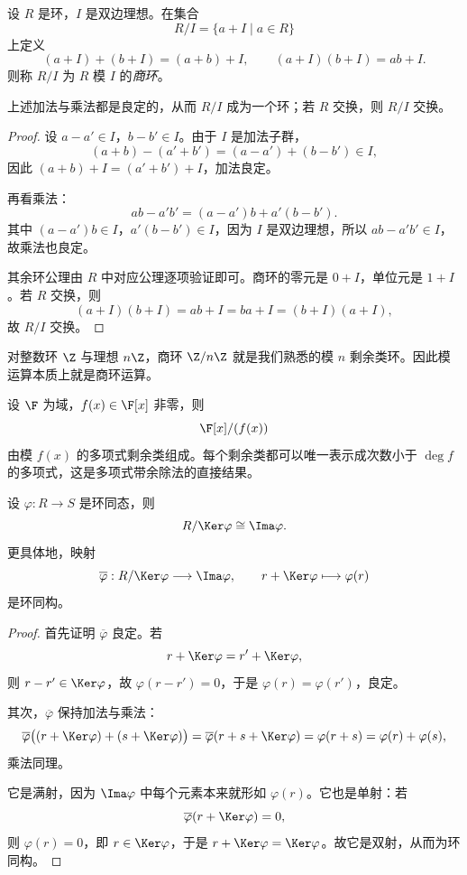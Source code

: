 \begin{definition}
设 $R$ 是环，$I$ 是双边理想。在集合
\[
R/I=\{a+I\mid a\in R\}
\]
上定义
\[
(a+I)+(b+I)=(a+b)+I,
\qquad
(a+I)(b+I)=ab+I.
\]
则称 $R/I$ 为 $R$ 模 $I$ 的\emph{商环}。
\end{definition}

\begin{proposition}
上述加法与乘法都是良定的，从而 $R/I$ 成为一个环；若 $R$ 交换，则 $R/I$ 交换。
\end{proposition}

\begin{proof}
设 $a-a'\in I$，$b-b'\in I$。由于 $I$ 是加法子群，
\[
(a+b)-(a'+b')=(a-a')+(b-b')\in I,
\]
因此 $(a+b)+I=(a'+b')+I$，加法良定。

再看乘法：
\[
ab-a'b'=(a-a')b+a'(b-b').
\]
其中 $(a-a')b\in I$，$a'(b-b')\in I$，因为 $I$ 是双边理想，所以 $ab-a'b'\in I$，故乘法也良定。

其余环公理由 $R$ 中对应公理逐项验证即可。商环的零元是 $0+I$，单位元是 $1+I$。若 $R$ 交换，则
\[
(a+I)(b+I)=ab+I=ba+I=(b+I)(a+I),
\]
故 $R/I$ 交换。
\end{proof}

\begin{example}
对整数环 $\Z$ 与理想 $n\Z$，商环 $\Z/n\Z$ 就是我们熟悉的模 $n$ 剩余类环。因此模运算本质上就是商环运算。
\end{example}

\begin{example}
设 $\F$ 为域，$f(x)\in\F[x]$ 非零，则
\[
\F[x]/(f(x))
\]
由模 $f(x)$ 的多项式剩余类组成。每个剩余类都可以唯一表示成次数小于 $\deg f$ 的多项式，这是多项式带余除法的直接结果。
\end{example}

\begin{theorem}[第一同构定理]
设 $\varphi:R\to S$ 是环同态，则
\[
R/\Ker\varphi\cong \Ima\varphi.
\]
更具体地，映射
\[
\overline{\varphi}:R/\Ker\varphi\longrightarrow \Ima\varphi,
\qquad
r+\Ker\varphi\longmapsto \varphi(r)
\]
是环同构。
\end{theorem}

\begin{proof}
首先证明 $\overline{\varphi}$ 良定。若
\[
r+\Ker\varphi=r'+\Ker\varphi,
\]
则 $r-r'\in\Ker\varphi$，故 $\varphi(r-r')=0$，于是 $\varphi(r)=\varphi(r')$，良定。

其次，$\overline{\varphi}$ 保持加法与乘法：
\[
\overline{\varphi}\bigl((r+\Ker\varphi)+(s+\Ker\varphi)\bigr)
=\overline{\varphi}(r+s+\Ker\varphi)=\varphi(r+s)=\varphi(r)+\varphi(s),
\]
乘法同理。

它是满射，因为 $\Ima\varphi$ 中每个元素本来就形如 $\varphi(r)$。它也是单射：若
\[
\overline{\varphi}(r+\Ker\varphi)=0,
\]
则 $\varphi(r)=0$，即 $r\in\Ker\varphi$，于是 $r+\Ker\varphi=\Ker\varphi$。故它是双射，从而为环同构。
\end{proof}

